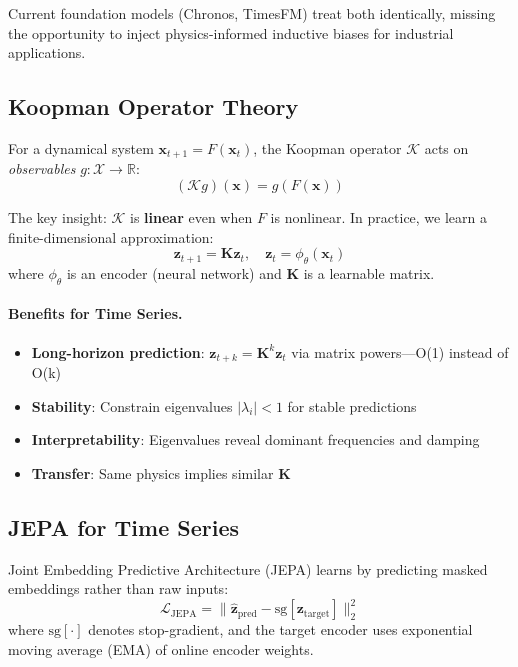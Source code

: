 \documentclass{article}
\begin{document}
Current foundation models (Chronos, TimesFM) treat both identically, missing the opportunity to inject physics-informed inductive biases for industrial applications.

\subsection{Koopman Operator Theory}

For a dynamical system $\mathbf{x}_{t+1} = F(\mathbf{x}_t)$, the Koopman operator $\mathcal{K}$ acts on \emph{observables} $g: \mathcal{X} \rightarrow \mathbb{R}$:
\begin{equation}
    (\mathcal{K} g)(\mathbf{x}) = g(F(\mathbf{x}))
\end{equation}

The key insight: $\mathcal{K}$ is \textbf{linear} even when $F$ is nonlinear. In practice, we learn a finite-dimensional approximation:
\begin{equation}
    \mathbf{z}_{t+1} = \mathbf{K} \mathbf{z}_t, \quad \mathbf{z}_t = \phi_\theta(\mathbf{x}_t)
\end{equation}
where $\phi_\theta$ is an encoder (neural network) and $\mathbf{K}$ is a learnable matrix.

\paragraph{Benefits for Time Series.}
\begin{itemize}
    \item \textbf{Long-horizon prediction}: $\mathbf{z}_{t+k} = \mathbf{K}^k \mathbf{z}_t$ via matrix powers—O(1) instead of O(k)
    \item \textbf{Stability}: Constrain eigenvalues $|\lambda_i| < 1$ for stable predictions
    \item \textbf{Interpretability}: Eigenvalues reveal dominant frequencies and damping
    \item \textbf{Transfer}: Same physics implies similar $\mathbf{K}$
\end{itemize}

\subsection{JEPA for Time Series}

Joint Embedding Predictive Architecture (JEPA) \cite{ijepa, vjepa} learns by predicting masked embeddings rather than raw inputs:
\begin{equation}
    \mathcal{L}_{\text{JEPA}} = \|\hat{\mathbf{z}}_{\text{pred}} - \text{sg}[\mathbf{z}_{\text{target}}]\|_2^2
\end{equation}
where $\text{sg}[\cdot]$ denotes stop-gradient, and the target encoder uses exponential moving average (EMA) of online encoder weights.
\end{document}
